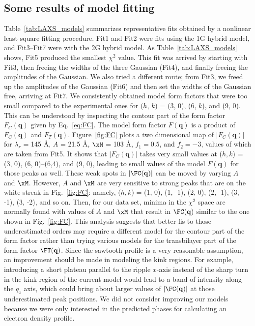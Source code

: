 \subsection{Some results of model fitting}\label{sec:LAXS_model_results}
Table~\ref{tab:LAXS_models} summarizes representative fits obtained by a nonlinear
least square fitting procedure. Fit1 and Fit2 were fits using the 1G hybrid model,
and Fit3--Fit7 were with the 2G hybrid model. As Table~\ref{tab:LAXS_models} shows, 
Fit5 produced the smallest $\chi^2$ value. This fit was arrived by 
starting with
Fit3, then freeing the widths of the three Gaussian (Fit4), 
and finally freeing the amplitudes of the Gaussian.
We also tried a different route; from Fit3, we freed up the amplitudes of 
the Gaussian (Fit6) and then set the widths of the Gaussian free, arriving  
at Fit7. 
We consistently obtained model
form factors that were too small compared to the experimental ones 
for ($h$, $k$) = (3, 0), (6, $k$), and (9, 0). This can be understood by
inspecting the contour part of the form factor $F_C(\mathbf{q})$ 
given by Eq.~\ref{eq:FC}.
The model form factor $F(\mathbf{q})$ is a product of
$F_C(\mathbf{q})$ and $F_T(\mathbf{q})$.
Figure~\ref{fig:FC} plots a two dimensional map of $|F_C(\mathbf{q})|$ for
$\lambda_r$ = 145 \AA, $A$ = 21.5 \AA, $\xM$ = 103 \AA, $f_1=0.5$,
and $f_2=-3$, values of which are taken from Fit5.
It shows that $|F_C(\mathbf{q})|$ takes very small values at 
($h, k$) = (3, 0), (6, 0)--(6,4), and (9, 0), leading to small values of
the model $F(\mathbf{q})$ for those peaks as well. These weak spots in $|\FC(\mathbf{q})|$
can be moved by varying $A$ and $\xM$. However, $A$ and $\xM$ are very 
sensitive to strong peaks that are on the white streak in Fig.~\ref{fig:FC}:
namely, ($h, k$) = (1, 0), (1, -1), (2, 0), (2, -1), (3, -1), (3, -2), and so on.
Then, for our data set, minima in the $\chi^2$ space are normally found
with values of $A$ and $\xM$ that result in $\FC(\mathbf{q})$ similar to the 
one shown in Fig.~\ref{fig:FC}.
This analysis 
suggests that better fis to those underestimated orders may require a different model
for the contour part of the form factor rather than trying various
models for the transbilayer part of the form factor $\FT(\mathbf{q})$. 
Since the sawtooth profile is a very reasonable assumption, an improvement
should be made in modeling the kink regions.
For example, introducing a short plateau parallel to the ripple $x$-axis
instead of the sharp turn in the kink region of the current model would
lead to a band of intensity along the $q_z$ axis, which could bring about 
larger values of $|\FC(\mathbf{q})|$ at those underestimated peak positions.
We did not consider improving our models because we were only interested in the predicted
phases for calculating an electron density profile.

